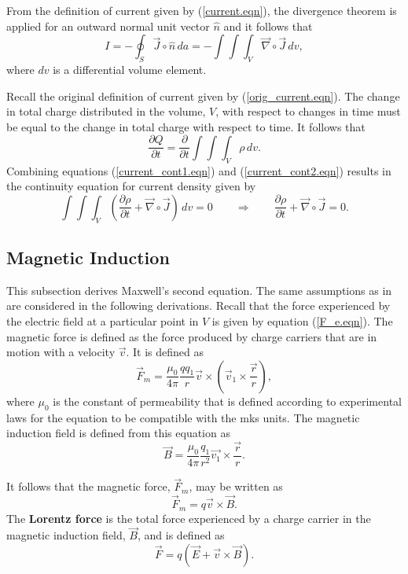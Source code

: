 \documentclass[12pt]{article}
\theoremstyle{definition}
\numberwithin{equation}{section}
\begin{document}
From the definition of current given by (\ref{current.eqn}), the divergence theorem is applied for an outward normal unit vector $\hat{n}$ and it follows that
\begin{equation}
I=-\oint_S\vec{J}\circ\hat{n}\, da=-\int\int\int_V\vec{\nabla}\circ\vec{J}\, dv,
\label{current_cont1.eqn}
\end{equation}
where $dv$ is a differential volume element.

Recall the original definition of current given by (\ref{orig_current.eqn}). The change in total charge distributed in the volume, $V$, with respect to changes in time must be equal to the change in total charge with respect to time. It follows that
\begin{equation}
\frac{\partial Q}{\partial t}=\frac{\partial}{\partial t}\int\int\int_V\rho\, dv.
\label{current_cont2.eqn}
\end{equation}
Combining equations (\ref{current_cont1.eqn}) and (\ref{current_cont2.eqn}) results in the continuity equation for current density given by
$$\int\int\int_V\left(\frac{\partial\rho}{\partial t}+\vec{\nabla}\circ\vec{J}\right)\, dv=0\qquad\Rightarrow\qquad\frac{\partial\rho}{\partial t}+\vec{\nabla}\circ\vec{J}=0.$$
\subsection{Magnetic Induction}\label{mag_induction.sec}
This subsection derives Maxwell's second equation. The same assumptions as in \cite{Reitz} are considered in the following derivations. Recall that the force experienced by the electric field at a particular point in $V$ is given by equation (\ref{F_e.eqn}). The magnetic force is defined as the force produced by charge carriers that are in motion with a velocity $\vec{v}$. It is defined as
$$\vec{F}_m=\frac{\mu_0}{4\pi}\frac{qq_1}{r}\vec{v}\times\left(\vec{v}_1\times\frac{\vec{r}}{r}\right),$$
where $\mu_0$ is the constant of permeability that is defined according to experimental laws for the equation to be compatible with the mks units. The magnetic induction field is defined from this equation as
$$\vec{B}=\frac{\mu_0}{4\pi}\frac{q_1}{r^2}\vec{v_1}\times\frac{\vec{r}}{r}.$$

It follows that the magnetic force, $\vec{F}_m$, may be written as
\begin{equation}
\vec{F}_m=q\vec{v}\times\vec{B}.
\end{equation}
The \textbf{Lorentz force} is the total force experienced by a charge carrier in the magnetic induction field, $\vec{B}$, and is defined as
\begin{equation}
\vec{F}=q\left(\vec{E}+\vec{v}\times\vec{B}\right).
\label{lorentz.eqn}
\end{equation}
\end{document}
